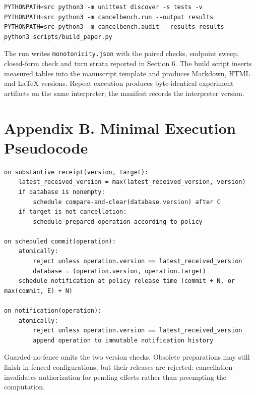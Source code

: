 \documentclass[review,12pt]{elsarticle}
\begin{document}
\begin{lstlisting}
PYTHONPATH=src python3 -m unittest discover -s tests -v
PYTHONPATH=src python3 -m cancelbench.run --output results
PYTHONPATH=src python3 -m cancelbench.audit --results results
python3 scripts/build_paper.py
\end{lstlisting}

The run writes \texttt{monotonicity.json} with the paired checks, endpoint sweep, closed-form check and turn strata reported in Section 6. The build script inserts measured tables into the manuscript template and produces Markdown, HTML and LaTeX versions. Repeat execution produces byte-identical experiment artifacts on the same interpreter; the manifest records the interpreter version.


\section*{Appendix B. Minimal Execution Pseudocode}

\begin{lstlisting}
on substantive receipt(version, target):
    latest_received_version = max(latest_received_version, version)
    if database is nonempty:
        schedule compare-and-clear(database.version) after C
    if target is not cancellation:
        schedule prepared operation according to policy

on scheduled commit(operation):
    atomically:
        reject unless operation.version == latest_received_version
        database = (operation.version, operation.target)
    schedule notification at policy release time (commit + N, or max(commit, E) + N)

on notification(operation):
    atomically:
        reject unless operation.version == latest_received_version
        append operation to immutable notification history
\end{lstlisting}

Guarded-no-fence omits the two version checks. Obsolete preparations may still finish in fenced configurations, but their releases are rejected: cancellation invalidates authorization for pending effects rather than preempting the computation.
\end{document}
